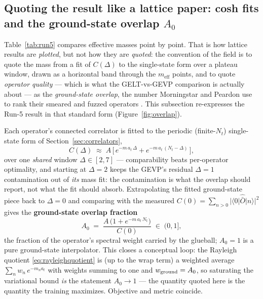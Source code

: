 \documentclass[11pt,a4paper]{article}
\newcommand{\meff}{m_{\mathrm{eff}}}
\newcommand{\at}{a_t}
\begin{document}
\subsection{Quoting the result like a lattice paper: cosh fits and the
ground-state overlap $A_0$}
\label{sec:overlap}

Table~\ref{tab:run5} compares effective masses point by point. That is how
lattice results are \emph{plotted}, but not how they are \emph{quoted}: the
convention of the field is to quote the mass from a fit of $C(\Delta)$ to the
single-state form over a plateau window, drawn as a horizontal band through
the $\meff$ points, and to quote \emph{operator quality} --- which is what
the GELT-vs-GEVP comparison is actually about --- as the \emph{ground-state
overlap}, the number Morningstar and Peardon use to rank their smeared and
fuzzed operators \cite{MorningstarPeardon1999}. This subsection re-expresses
the Run-5 result in that standard form (Figure~\ref{fig:overlap}).

Each operator's connected correlator is fitted to the periodic
(finite-$N_t$) single-state form of Section~\ref{sec:correlators},
\begin{equation}
  C(\Delta) \;\approx\;
  A\,\big[\, e^{-m\,\at\,\Delta} + e^{-m\,\at\,(N_t-\Delta)} \,\big],
  \label{eq:coshfit}
\end{equation}
over one \emph{shared} window $\Delta\in[2,7]$ --- comparability beats
per-operator optimality, and starting at $\Delta=2$ keeps the GEVP's residual
$\Delta=1$ contamination out of \emph{its} mass fit: the contamination is
what the overlap should report, not what the fit should absorb. Extrapolating
the fitted ground-state piece back to $\Delta=0$ and comparing with the
measured $C(0)=\sum_{n>0}|\langle0|\hat{\bar O}|n\rangle|^2$ gives the
\textbf{ground-state overlap fraction}
\begin{equation}
  A_0 \;=\; \frac{A\,\big(1+e^{-m\,\at\,N_t}\big)}{C(0)} \;\in\; (0,1] ,
  \label{eq:overlap}
\end{equation}
the fraction of the operator's spectral weight carried by the glueball;
$A_0=1$ is a pure ground-state interpolator. This closes a conceptual loop:
the Rayleigh quotient \eqref{eq:rayleighquotient} is (up to the wrap term) a
weighted average $\sum_n w_n\,e^{-m_n\at}$ with weights summing to one and
$w_{\rm ground}=A_0$, so saturating the variational bound \emph{is} the
statement $A_0\to1$ --- the quantity quoted here is the quantity the
training maximizes. Objective and metric coincide.
\end{document}
